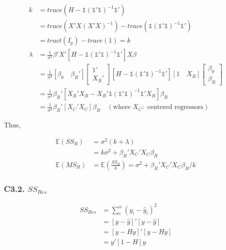 \documentclass[12pt]{article}
\begin{document}
$$
\begin{aligned}
k &= trace \left( H - \mathds{1} (\mathds{1}' \mathds{1})^{-1} \mathds{1}'  \right) \\[8pt]
&= trace(X'X (X'X)^{-1}) - trace(\mathds{1} (\mathds{1}' \mathds{1})^{-1} \mathds{1}') \\[8pt]
&= tract(I_p) - trace(1) = k \\[10pt]
\lambda &= \frac{1}{\sigma^2} \beta' X' \left[ H - \mathds{1} (\mathds{1}' \mathds{1})^{-1} \mathds{1}' \right] X \beta \\[8pt]
&= \frac{1}{\sigma^2} \left[ \beta_0 \quad \beta_R' \right] \begin{bmatrix} 1' \\ X_R'\end{bmatrix}
\left[ H - \mathds{1} (\mathds{1}' \mathds{1})^{-1} \mathds{1}' \right] \left[ 1 \quad X_R \right] \begin{bmatrix} \beta_0 \\ \beta_R \end{bmatrix} \\[8pt]
&=\frac{1}{\sigma^2}\beta_R' [X_R' X_R - X_R'  \mathds{1} (\mathds{1}' \mathds{1})^{-1} \mathds{1}' X_R] \beta_R \\[8pt]
&= \frac{1}{\sigma^2}\beta_R' [X_C' X_C] \beta_R \quad (\text{where } X_C : \text{ centered regressors})
\end{aligned}
$$

Thus,

$$
\begin{aligned}
\mathbb{E} (SS_R) &= \sigma^2 \left( k + \lambda \right) \\[8pt]
&= k \sigma^2 + \beta_R' X_C' X_C \beta_R \\[10pt]
\mathbb{E} (MS_R) &= \mathbb{E} \left( \frac{SS_R}{k} \right) = \sigma^2 + \beta_R' X_C' X_C \beta_R /k
\end{aligned}
$$




\subsubsection*{C3.2. $SS_{Res}$}


$$
\begin{aligned}
SS_{Res} &= \sum_i^n (y_i - \hat{y}_i)^2 \\
&= [y - \hat{y}]' [y - \hat{y}] \\
&= [y - Hy ]' [y - Hy ] \\
&= y' [1 - H]y 
\end{aligned}
$$
\end{document}
